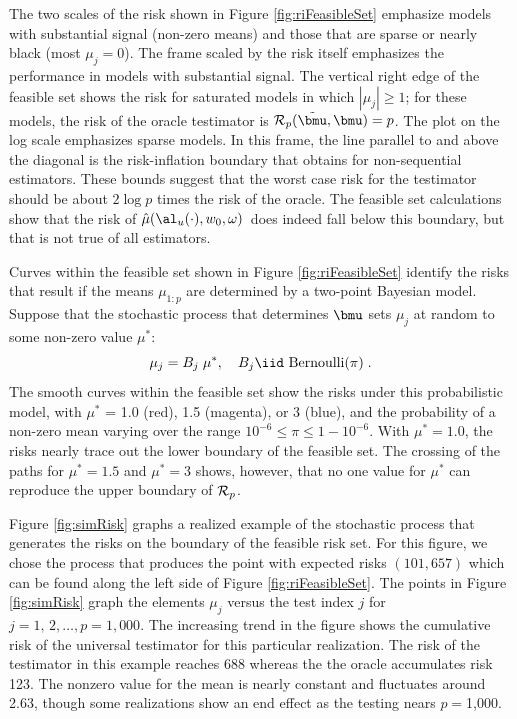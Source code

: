 \documentclass[12pt]{article}
\newcommand{\uTest}{\mbox{$\hat\mu(\al_u(\cdot),w_0,\omega)$}}
\begin{document}
 The two scales of the risk shown in Figure \ref{fig:riFeasibleSet} emphasize
 models with substantial signal (non-zero means) and those that are sparse or
 nearly black (most $\mu_j=0$).  The frame scaled by the risk itself emphasizes
 the performance in models with substantial signal.  The vertical right edge of
 the feasible set shows the risk for saturated models in which $|\mu_j| \ge 1$;
 for these models, the risk of the oracle testimator is ${\cal
 R}_p(\tilde{\bmu}, \bmu) = p$.  The plot on the log scale emphasizes sparse
 models.  In this frame, the line parallel to and above the diagonal is the
 risk-inflation boundary  that obtains for non-sequential estimators.
  These bounds suggest that the worst case risk for the testimator should be
 about $2 \log p$ times the risk of the oracle.  The feasible set calculations
 show that the risk of \uTest\ does indeed fall below this boundary, but that is
 not true of all estimators. 


 Curves within the feasible set shown in Figure \ref{fig:riFeasibleSet} identify
 the risks that result if the means $\mu_{1:p}$ are determined by a two-point
 Bayesian model.  Suppose that the stochastic process that determines $\bmu$
 sets $\mu_j$ at random to some non-zero value $\mu^{*}$:
 \begin{equation}
    \mu_j = B_j \; \mu^{*}, \quad B_j  \iid \mbox{ Bernoulli}(\pi)  \;.
 \label{eq:muj}
 \end{equation}
 The smooth curves within the feasible set show the risks under this
 probabilistic model, with $\mu^{*}$ = 1.0 (red), 1.5 (magenta), or 3 (blue),
 and the probability of a non-zero mean varying over the range $10^{-6} \le \pi
 \le 1-10^{-6}$.  With $\mu^{*} = 1.0$, the risks nearly trace out the lower
 boundary of the feasible set.  The crossing of the paths for $\mu^{*}=1.5$ and
 $\mu^{*}=3$ shows, however, that no one value for $\mu^{*}$ can reproduce the
 upper boundary of ${\cal R}_p$.


 Figure \ref{fig:simRisk} graphs a realized example of the stochastic process
 that generates the risks on the boundary of the feasible risk set.  For this
 figure, we chose the process that produces the point with expected risks $(101,
 657)$ which can be found along the left side of Figure \ref{fig:riFeasibleSet}.
  The points in Figure \ref{fig:simRisk} graph the elements $\mu_j$ versus the
 test index $j$ for $j = 1,\,2, \ldots, p=1,000$.  The increasing trend in the
 figure shows the cumulative risk of the universal testimator for this
 particular realization.  The risk of the testimator in this example reaches 688
 whereas the the oracle accumulates risk 123.  The nonzero value for the mean is
 nearly constant and fluctuates around 2.63, though some realizations show an
 end effect as the testing nears $p=$1,000.
\end{document}
